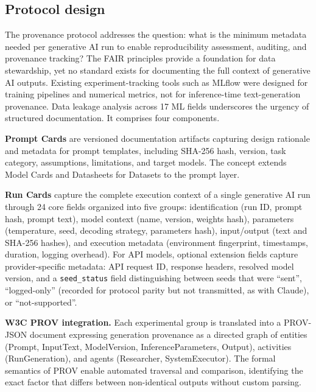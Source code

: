 \documentclass[sn-nature]{sn-jnl}
\begin{document}
\subsection{Protocol design}\label{subsec:protocol}

The provenance protocol addresses the question: what is the minimum metadata needed per generative AI run to enable reproducibility assessment, auditing, and provenance tracking?
The FAIR principles\cite{wilkinson2016fair} provide a foundation for data stewardship, yet no standard exists for documenting the full context of generative AI outputs.
Existing experiment-tracking tools such as MLflow\cite{zaharia2018accelerating} were designed for training pipelines and numerical metrics, not for inference-time text-generation provenance.
Data leakage analysis across 17 ML fields\cite{kapoor2023leakage} underscores the urgency of structured documentation.
It comprises four components.

\textbf{Prompt Cards} are versioned documentation artifacts capturing design rationale and metadata for prompt templates, including SHA-256 hash, version, task category, assumptions, limitations, and target models.
The concept extends Model Cards\cite{mitchell2019model} and Datasheets for Datasets\cite{gebru2021datasheets} to the prompt layer.

\textbf{Run Cards} capture the complete execution context of a single generative AI run through 24 core fields organized into five groups: identification (run ID, prompt hash, prompt text), model context (name, version, weights hash), parameters (temperature, seed, decoding strategy, parameters hash), input/output (text and SHA-256 hashes), and execution metadata (environment fingerprint, timestamps, duration, logging overhead).
For API models, optional extension fields capture provider-specific metadata: API request ID, response headers, resolved model version, and a \texttt{seed\_status} field distinguishing between seeds that were ``sent'', ``logged-only'' (recorded for protocol parity but not transmitted, as with Claude), or ``not-supported''.

\textbf{W3C PROV integration.}
Each experimental group is translated into a PROV-JSON document\cite{w3cprov2013} expressing generation provenance as a directed graph of entities (Prompt, InputText, ModelVersion, InferenceParameters, Output), activities (RunGeneration), and agents (Researcher, SystemExecutor).
The formal semantics of PROV enable automated traversal and comparison, identifying the exact factor that differs between non-identical outputs without custom parsing.
\end{document}
